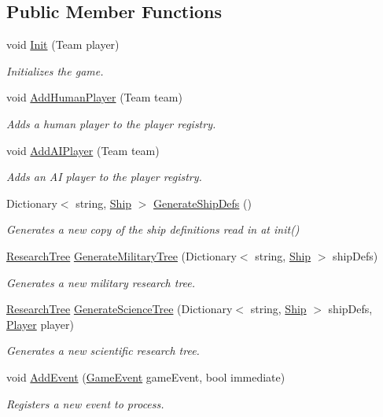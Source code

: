 \subsection*{Public Member Functions}
\begin{DoxyCompactItemize}
\item 
void \hyperlink{class_game_manager_aa96cb6bfba6863bc1db6a0298862b531}{Init} (Team player)
\begin{DoxyCompactList}\small\item\em Initializes the game. \end{DoxyCompactList}\item 
void \hyperlink{class_game_manager_a54fcf6264af5230756d7359be2ba7835}{Add\+Human\+Player} (Team team)
\begin{DoxyCompactList}\small\item\em Adds a human player to the player registry. \end{DoxyCompactList}\item 
void \hyperlink{class_game_manager_a5c247b7f54dc0088d75d7e284034fe03}{Add\+A\+I\+Player} (Team team)
\begin{DoxyCompactList}\small\item\em Adds an A\+I player to the player registry. \end{DoxyCompactList}\item 
Dictionary$<$ string, \hyperlink{class_ship}{Ship} $>$ \hyperlink{class_game_manager_a9244fca24c585304d87a273dcd1320dd}{Generate\+Ship\+Defs} ()
\begin{DoxyCompactList}\small\item\em Generates a new copy of the ship definitions read in at init() \end{DoxyCompactList}\item 
\hyperlink{class_research_tree}{Research\+Tree} \hyperlink{class_game_manager_afea293389b7fe2bf339a228ce27cd4e2}{Generate\+Military\+Tree} (Dictionary$<$ string, \hyperlink{class_ship}{Ship} $>$ ship\+Defs)
\begin{DoxyCompactList}\small\item\em Generates a new military research tree. \end{DoxyCompactList}\item 
\hyperlink{class_research_tree}{Research\+Tree} \hyperlink{class_game_manager_a8b0eb6853c2f2f9319fcaeb5ddbae3a4}{Generate\+Science\+Tree} (Dictionary$<$ string, \hyperlink{class_ship}{Ship} $>$ ship\+Defs, \hyperlink{class_player}{Player} player)
\begin{DoxyCompactList}\small\item\em Generates a new scientific research tree. \end{DoxyCompactList}\item 
void \hyperlink{class_game_manager_a8173c6ad82694534cccccfc43d39de8f}{Add\+Event} (\hyperlink{class_game_event}{Game\+Event} game\+Event, bool immediate)
\begin{DoxyCompactList}\small\item\em Registers a new event to process. \end{DoxyCompactList}\end{DoxyCompactItemize}
